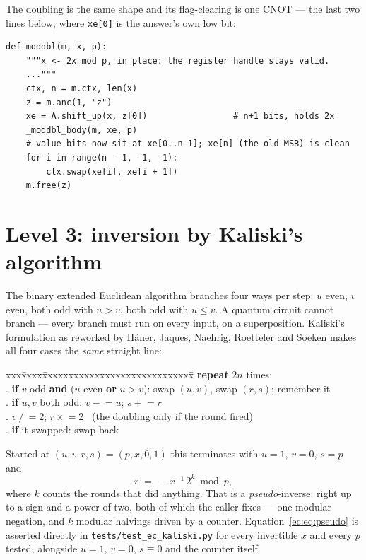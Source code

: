 \documentclass[11pt]{article}
\newcommand{\code}[1]{\texttt{#1}}
\theoremstyle{plain}
\theoremstyle{remark}
\begin{document}
\noindent
The doubling is the same shape and its flag-clearing is one CNOT --- the last two lines below,
where \code{xe[0]} is the answer's own low bit:

\begin{lstlisting}
def moddbl(m, x, p):
    """x <- 2x mod p, in place: the register handle stays valid.
    ..."""
    ctx, n = m.ctx, len(x)
    z = m.anc(1, "z")
    xe = A.shift_up(x, z[0])                 # n+1 bits, holds 2x
    _moddbl_body(m, xe, p)
    # value bits now sit at xe[0..n-1]; xe[n] (the old MSB) is clean
    for i in range(n - 1, -1, -1):
        ctx.swap(xe[i], xe[i + 1])
    m.free(z)
\end{lstlisting}

\section{Level 3: inversion by Kaliski's algorithm}\label{ec:sec:kaliski}

The binary extended Euclidean algorithm branches four ways per step: $u$ even, $v$ even, both odd
with $u>v$, both odd with $u\le v$. A quantum circuit cannot branch --- every branch must run on
every input, on a superposition. Kaliski's formulation as reworked by H\"aner, Jaques, Naehrig,
Roetteler and Soeken \cite{ec:hjnrs20} makes all four cases the \emph{same} straight line:

\begin{center}\small
\begin{minipage}{0.86\textwidth}
\begin{tabbing}
xxx\=xxxx\=xxxxxxxxxxxxxxxxxxxxxxxxxxxxx\=\kill
\> \textbf{repeat} $2n$ times:\\
.\> \textbf{if} $v$ odd \textbf{and} ($u$ even \textbf{or} $u>v$): \> swap $(u,v)$, swap $(r,s)$; remember it\\
.\> \textbf{if} $u,v$ both odd: \> $v \mathrel{-}= u$; \quad $s \mathrel{+}= r$\\
.\> \> $v \mathrel{/}= 2$; \quad $r \mathrel{\times}= 2$ \ (the doubling only if the round fired)\\
.\> \textbf{if} it swapped: \> swap back
\end{tabbing}
\end{minipage}
\end{center}

\noindent
Started at $(u,v,r,s)=(p,x,0,1)$ this terminates with $u=1$, $v=0$, $s=p$ and
\begin{equation}\label{ec:eq:pseudo}
r \;=\; -x^{-1}\,2^{k} \bmod p,
\end{equation}
where $k$ counts the rounds that did anything. That is a \emph{pseudo}-inverse: right up to a sign
and a power of two, both of which the caller fixes --- one modular negation, and $k$ modular
halvings driven by a counter. Equation~\eqref{ec:eq:pseudo} is asserted directly in
\code{tests/test\_ec\_kaliski.py} for every invertible $x$ and every $p$ tested, alongside
$u=1$, $v=0$, $s\equiv0$ and the counter itself.
\end{document}
